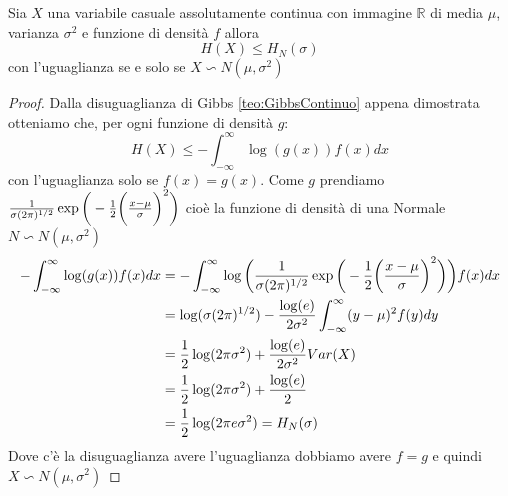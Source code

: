 \begin{teo}
Sia $X$ una variabile casuale assolutamente continua con immagine $\mathbb{R}$ di media $\mu$, varianza $\sigma^2$ e funzione di densità $f$ allora
$$H(X) \leq H_N(\sigma)$$
con l'uguaglianza se e solo se $X\backsim N(\mu,\sigma^2)$
\end{teo}
\begin{proof}
Dalla disuguaglianza di Gibbs \ref{teo:GibbsContinuo} appena dimostrata otteniamo che, per ogni funzione di densità $g$:
$$H(X)\leq - \int_{-\infty}^\infty \log (g(x))f(x)dx$$
con l'uguaglianza solo se $f(x)=g(x)$.
Come $g$ prendiamo $\frac{1}{\sigma (2\pi)^{1/2}} \exp \bigg( - \frac{1}{2} \bigg( \frac{x-\mu}{ \sigma} \bigg)^2 \bigg)$ cioè la funzione di densità di una Normale $N\backsim N(\mu, \sigma^2)$
\[
\begin{split}
- \int_{-\infty}^\infty \log (g(x))f(x)dx &= - \int_{-\infty}^\infty \log \bigg( \frac{1}{\sigma (2\pi)^{1/2}} \exp \bigg( - \frac{1}{2} \bigg( \frac{x-\mu}{ \sigma} \bigg)^2 \bigg)\bigg)f(x)dx\\
&= \log(\sigma(2\pi)^{1/2})- \frac{\log(e)}{2\sigma^2}\int_{-\infty}^{\infty} (y-\mu)^2f(y)dy \\
&= \frac{1}{2} \log(2\pi \sigma^2)+ \frac{ \log(e)}{2\sigma^2} Var(X)\\
&=\frac{1}{2} \log(2\pi \sigma^2)+ \frac{ \log(e)}{2}\\
&=\frac{1}{2} \log(2\pi e \sigma^2)=H_N(\sigma)
\end{split}
\]
Dove c'è la disuguaglianza avere l'uguaglianza dobbiamo avere $f=g$ e quindi $X\backsim N(\mu,\sigma^2)$
\end{proof}









